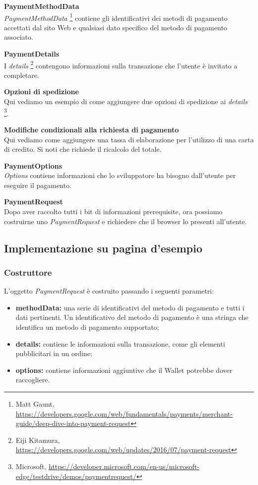 \documentclass[11pt ,a4paper , twoside , openright ]{book}
\begin{document}
	\pagebreak
	\textbf{PaymentMethodData}
	\\
	\textit{PaymentMethodData} \footnote{Matt Gaunt, \url{https://developers.google.com/web/fundamentals/payments/merchant-guide/deep-dive-into-payment-request}} contiene gli identificativi dei metodi di pagamento accettati dal sito Web e qualsiasi dato specifico del metodo di pagamento associato.
	
	\textbf{PaymentDetails}
	\\
	I \textit{details} \footnote{Eiji Kitamura, \url{https://developers.google.com/web/updates/2016/07/payment-request}} contengono informazioni sulla transazione che l'utente è invitato a completare.
	
	\pagebreak
	\textbf{Opzioni di spedizione}
	\\
	Qui vediamo un esempio di come aggiungere due opzioni di spedizione ai \textit{details} \footnote{Microsoft, \url{https://developer.microsoft.com/en-us/microsoft-edge/testdrive/demos/paymentrequest/}}.
	
	
	\flushleft\textbf{Modifiche condizionali alla richiesta di pagamento}
	\\
	Qui vediamo come aggiungere una tassa di elaborazione per l'utilizzo di una carta di credito. Si noti che richiede il ricalcolo del totale.
	
	\pagebreak
	\textbf{PaymentOptions} \\
	\textit{Options} contiene informazioni che lo sviluppatore ha bisogno dall'utente per eseguire il pagamento.
	
	
	\textbf{PaymentRequest} \\
	Dopo aver raccolto tutti i bit di informazioni prerequisite, ora possiamo costruirne uno \textit{PaymentRequest} e richiedere che il browser lo presenti all'utente.
	
	
	
	\subsection{Implementazione su pagina d'esempio \cite{rif15}}
	\subsubsection{Costruttore}
	L'oggetto \textit{PaymentRequest} è costruito passando i seguenti parametri:
	\begin{itemize}
		\item \textbf{methodData:} una serie di identificativi del metodo di pagamento e tutti i dati pertinenti. Un identificativo del metodo di pagamento è una stringa che identifica un metodo di pagamento supportato;
		\item \textbf{details:} contiene le informazioni sulla transazione, come gli elementi pubblicitari in un ordine;
		\item \textbf{options:} contiene informazioni aggiuntive che il Wallet potrebbe dover raccogliere.
	\end{itemize}
	
\end{document}
